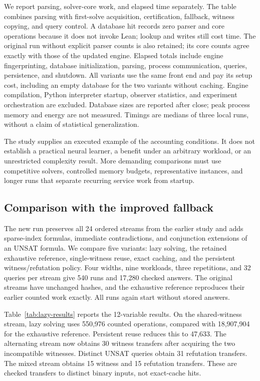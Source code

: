 \documentclass[11pt,a4paper]{article}
\numberwithin{equation}{section}
\theoremstyle{plain}
\theoremstyle{definition}
\theoremstyle{remark}
\begin{document}
We report parsing, solver-core work, and elapsed time separately. The table combines parsing with first-solve acquisition, certification, fallback, witness copying, and query control. A database hit records zero parser and core operations because it does not invoke Lean; lookup and writes still cost time. The original run without explicit parser counts is also retained; its core counts agree exactly with those of the updated engine. Elapsed totals include engine fingerprinting, database initialization, parsing, process communication, queries, persistence, and shutdown. All variants use the same front end and pay its setup cost, including an empty database for the two variants without caching. Engine compilation, Python interpreter startup, observer statistics, and experiment orchestration are excluded. Database sizes are reported after close; peak process memory and energy are not measured. Timings are medians of three local runs, without a claim of statistical generalization.

The study supplies an executed example of the accounting conditions. It does not establish a practical neural learner, a benefit under an arbitrary workload, or an unrestricted complexity result. More demanding comparisons must use competitive solvers, controlled memory budgets, representative instances, and longer runs that separate recurring service work from startup.


\subsection{Comparison with the improved fallback}
\label{sec:lazy-study}

The new run preserves all 24 ordered streams from the earlier study and adds sparse-index formulas, immediate contradictions, and conjunction extensions of an UNSAT formula. We compare five variants: lazy solving, the retained exhaustive reference, single-witness reuse, exact caching, and the persistent witness/refutation policy. Four widths, nine workloads, three repetitions, and 32 queries per stream give 540 runs and 17,280 checked answers. The original streams have unchanged hashes, and the exhaustive reference reproduces their earlier counted work exactly. All runs again start without stored answers.

Table~\ref{tab:lazy-results} reports the 12-variable results. On the shared-witness stream, lazy solving uses 550,976 counted operations, compared with 18,907,904 for the exhaustive reference. Persistent reuse reduces this to 47,633. The alternating stream now obtains 30 witness transfers after acquiring the two incompatible witnesses. Distinct UNSAT queries obtain 31 refutation transfers. The mixed stream obtains 15 witness and 15 refutation transfers. These are checked transfers to distinct binary inputs, not exact-cache hits.
\end{document}
